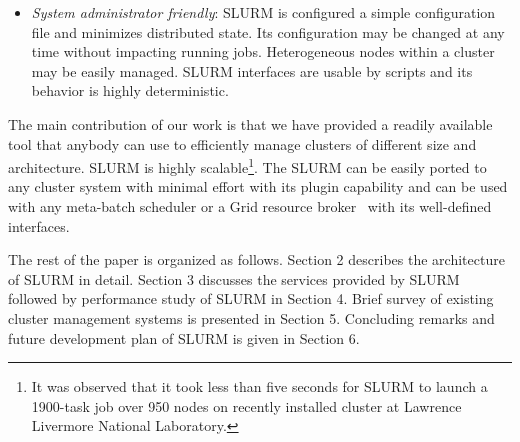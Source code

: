 \begin{itemize}
\item {\em System administrator friendly}: SLURM is configured a 
simple configuration file and minimizes distributed state.  
Its configuration may be changed at any time without impacting running jobs. 
Heterogeneous nodes within a cluster may be easily managed.
SLURM interfaces are usable by scripts and its behavior is highly 
deterministic.

\end{itemize}

The main contribution of our work is that we have provided a readily available 
tool that anybody can use to efficiently manage clusters of different size and architecture. 
SLURM is highly scalable\footnote{It was observed that it took less than five seconds for SLURM to launch a 1900-task job over 950 nodes on recently installed cluster at Lawrence Livermore National Laboratory.}. 
The SLURM can be easily ported to any cluster system with minimal effort with its plugin 
capability and can be used with any meta-batch scheduler or a Grid resource broker~\cite{Gridbook}
with its well-defined interfaces.

The rest of the paper is organized as follows. 
Section 2 describes the architecture of SLURM in detail. Section 3 discusses the services provided by SLURM followed by performance study of 
SLURM in Section 4. Brief survey of existing cluster management systems is presented in Section 5. 
Concluding remarks and future development plan of SLURM is given in Section 6.
